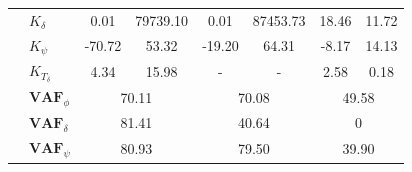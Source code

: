 \begin{table}[]
\begin{tabular}{llcccccc}
                                 & $K_\delta $           & 0.01                                       & 79739.10                                           & 0.01                                       & 87453.73                                           & 18.46                                      & 11.72                                              \\
                                 & $K_\psi $             & -70.72                                     & 53.32                                              & -19.20                                     & 64.31                                              & -8.17                                      & 14.13                                              \\
                                 & $K_{T_\delta}$        & 4.34                                       & 15.98                                              & -                                          & -                                                  & 2.58                                       & 0.18                                               \\ \cline{2-8} 
                                 & $\mathbf{VAF}_\phi$   & \multicolumn{2}{c}{70.11}                                                                       & \multicolumn{2}{c}{70.08}                                                                       & \multicolumn{2}{c}{49.58}                                                                       \\
                                 & $\mathbf{VAF}_\delta$ & \multicolumn{2}{c}{81.41}                                                                       & \multicolumn{2}{c}{40.64}                                                                       & \multicolumn{2}{c}{0}                                                                           \\
                                 & $\mathbf{VAF}_\psi$   & \multicolumn{2}{c}{80.93}                                                                       & \multicolumn{2}{c}{79.50}                                                                       & \multicolumn{2}{c}{39.90}                                                                      
    \end{tabular}
    \label{tb:variable}
    \end{table}
